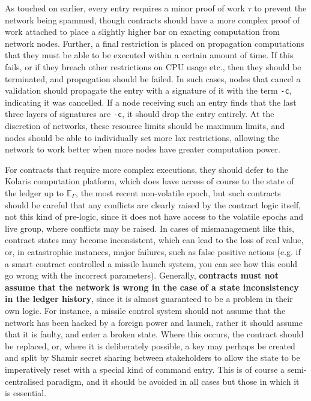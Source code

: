 \documentclass{extreport}
\begin{document}
As touched on earlier, every entry requires a minor proof of work \(\tau\) to prevent the network being spammed, though contracts should have a more complex proof of work attached to place a slightly higher bar on exacting computation from network nodes. Further, a final restriction is placed on propagation computations that they must be able to be executed within a certain amount of time. If this fails, or if they breach other restrictions on CPU usage etc., then they should be terminated, and propagation should be failed. In such cases, nodes that cancel a validation should propagate the entry with a signature of it with the term \texttt{-c}, indicating it was cancelled. If a node receiving such an entry finds that the last three layers of signatures are \texttt{-c}, it should drop the entry entirely. At the discretion of networks, these resource limits should be maximum limits, and nodes should be able to individually set more lax restrictions, allowing the network to work better when more nodes have greater computation power.

For contracts that require more complex executions, they should defer to the Kolaris computation platform, which does have access of course to the state of the ledger up to \(\mathbb{E}_\Gamma\), the most recent non-volatile epoch, but such contracts should be careful that any conflicts are clearly raised by the contract logic itself, not this kind of pre-logic, since it does not have access to the volatile epochs and live group, where conflicts may be raised. In cases of mismanagement like this, contract states may become inconsistent, which can lead to the loss of real value, or, in catastrophic instances, major failures, such as false positive actions (e.g. if a smart contract controlled a missile launch system, you can see how this could go wrong with the incorrect parameters). Generally, \textbf{contracts must not assume that the network is wrong in the case of a state inconsistency in the ledger history}, since it is almost guaranteed to be a problem in their own logic. For instance, a missile control system should not assume that the network has been hacked by a foreign power and launch, rather it should assume that it is faulty, and enter a broken state. Where this occurs, the contract should be replaced, or, where it is deliberately possible, a key may perhaps be created and split by Shamir secret sharing between stakeholders to allow the state to be imperatively reset with a special kind of command entry. This is of course a semi-centralised paradigm, and it should be avoided in all cases but those in which it is essential.
\end{document}
